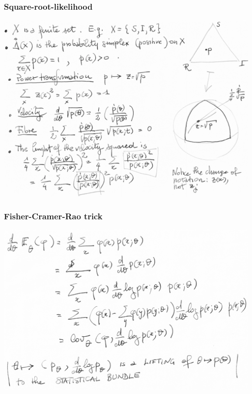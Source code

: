 \documentclass[xcolor=svgnames]{beamer}
\begin{document}
\begin{frame}[plain]\frametitle{Square-root-likelihood}

\includegraphics[width=\textwidth]{exercise/square-root-cropped.pdf}

\end{frame}

\begin{frame}[plain]\frametitle{Fisher-Cramer-Rao trick}

\includegraphics[width=\textwidth]{exercise/fisher-cramer-rao.pdf}

\end{frame}
\end{document}
